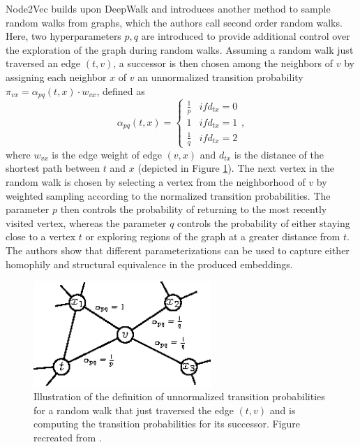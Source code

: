 \documentclass[draft,final]{vutinfth} %
\begin{document}
Node2Vec \cite{GroverL16} builds upon DeepWalk and introduces another method to sample random walks from graphs, which the authors call second order random walks. Here, two hyperparameters $p, q$ are introduced to provide additional control over the exploration of the graph during random walks. 
Assuming a random walk just traversed an edge $(t, v)$, a successor is then chosen among the neighbors of $v$ by assigning each neighbor $x$ of $v$ an unnormalized transition probability $\pi_{vx} = \alpha_{pq}(t,x) \cdot w_{vx}$, defined as  
\[
    \alpha_{pq}(t,x) = \begin{cases}
        \frac{1}{p} & if d_{tx} = 0 \\
        1 & if d_{tx} = 1 \\
        \frac{1}{q} & if d_{tx} = 2 
    \end{cases},    
\] 
where $w_{vx}$ is the edge weight of edge $(v,x)$ and $d_{tx}$ is the distance of the shortest path between $t$ and $x$ (depicted in Figure \ref{fig:node2vec}). The next vertex in the random walk is chosen by selecting a vertex from the neighborhood of $v$ by weighted sampling according to the normalized transition probabilities. 
The parameter $p$ then controls the probability of returning to the most recently visited vertex, whereas the parameter $q$ controls the probability of either staying close to a vertex $t$ or exploring regions of the graph at a greater distance from $t$. The authors show that different parameterizations can be used to capture either homophily and structural equivalence in the produced embeddings. 

\begin{figure}
    \centering
    \includegraphics[width=0.6\textwidth]{graphics/node2vec.eps}
    \caption{Illustration of the definition of unnormalized transition probabilities for a random walk that just traversed the edge $(t,v)$ and is computing the transition probabilities for its successor. Figure recreated from \cite{GroverL16}.}
    \label{fig:node2vec}
\end{figure}
\end{document}
